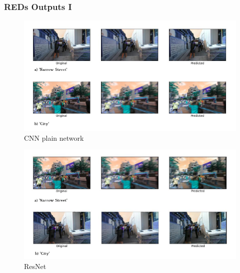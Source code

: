 \documentclass [handout] {beamer}
\begin{document}
\begin{frame}
	\frametitle{REDs Outputs I}
	\begin{figure}
		\centering
		\includegraphics[scale=0.22]{REDs_CNNBase_Outputs.png}
		\tiny{\caption{CNN plain network}}
	\end{figure}		
	
	\begin{figure}
		\centering
		\includegraphics[scale=0.22]{REDs_ResNet_Outputs.png}
		\tiny{\caption{ResNet}}
	\end{figure}		

\end{frame}
\end{document}
